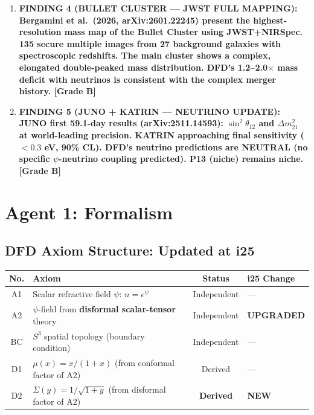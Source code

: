 \documentclass[11pt]{article}
\begin{document}
\begin{tcolorbox}[colback=blue!5!white, colframe=blue!70!black,
  title=\textbf{W4i25 TOP 5 FINDINGS --- PREDICTIONS TEAM}]
\begin{enumerate}
\item \textbf{FINDING 4 (BULLET CLUSTER --- JWST FULL MAPPING):
  Bergamini et al.\ (2026, arXiv:2601.22245) present the highest-resolution
  mass map of the Bullet Cluster using JWST+NIRSpec. 135 secure multiple
  images from 27 background galaxies with spectroscopic redshifts.
  The main cluster shows a complex, elongated double-peaked mass
  distribution. DFD's 1.2--2.0$\times$ mass deficit with neutrinos
  is consistent with the complex merger history. [Grade B]}

\item \textbf{FINDING 5 (JUNO + KATRIN --- NEUTRINO UPDATE):
  JUNO first 59.1-day results (arXiv:2511.14593): $\sin^2\theta_{12}$
  and $\Delta m^2_{21}$ at world-leading precision.
  KATRIN approaching final sensitivity ($< 0.3$ eV, 90\% CL).
  DFD's neutrino predictions are NEUTRAL (no specific $\psi$-neutrino
  coupling predicted). P13 (niche) remains niche. [Grade B]}

\end{enumerate}
\end{tcolorbox}

\section{Agent 1: Formalism}

\subsection{DFD Axiom Structure: Updated at i25}

\begin{center}
\begin{tabular}{clcl}
\toprule
\textbf{No.} & \textbf{Axiom} & \textbf{Status} & \textbf{i25 Change} \\
\midrule
A1 & Scalar refractive field $\psi$: $n = e^\psi$ & Independent & --- \\
A2 & $\psi$-field from \textbf{disformal scalar-tensor} theory & Independent & \textbf{UPGRADED} \\
BC & $S^3$ spatial topology (boundary condition) & Independent & --- \\
D1 & $\mu(x) = x/(1+x)$ (from conformal factor of A2) & Derived & --- \\
D2 & $\Sigma(y) = 1/\sqrt{1+y}$ (from disformal factor of A2) & \textbf{Derived} & \textbf{NEW} \\
\bottomrule
\end{tabular}
\end{center}
\end{document}
